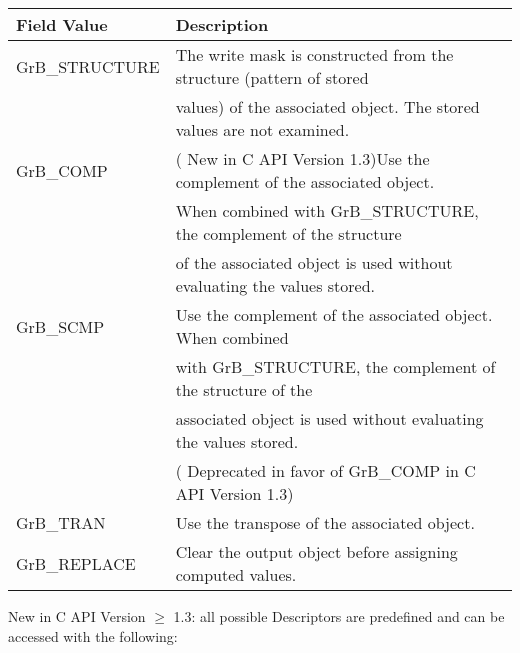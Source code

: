\documentclass[11pt]{article}
\begin{document}
\begin{tabular}{l|l} \hline
Field Value          & Description \\ \hline
{\sf GrB\_STRUCTURE} &  The write mask is constructed from the structure (pattern of stored \\
                     &  values) of the associated object. The stored values are not examined.\\
{\sf GrB\_COMP}      &  ({\color{red} New in C API Version 1.3})Use the complement of the associated object. \\ 
                     & When combined with {\sf GrB\_STRUCTURE}, the complement of the structure \\
                     &  of the associated object is used without evaluating the values stored.\\
{\sf GrB\_SCMP}      &  Use the complement of the associated object. When combined \\ 
                     &  with {\sf GrB\_STRUCTURE}, the complement of the structure of the \\
             &  associated object is used without evaluating the values stored. \\
             &  ({\color{red} Deprecated in favor of {\sf GrB\_COMP} in C API Version 1.3}) \\
{\sf GrB\_TRAN}      &  Use the transpose of the associated object.\\
{\sf GrB\_REPLACE}   &  Clear the output object before assigning computed values.\\ \hline
\end{tabular}

{\color{red} New in C API Version $\geq$ 1.3}: all possible Descriptors are predefined and can be accessed with the following:

\newcommand{\grboutp}{{\sf GrB\_OUTP}}
\newcommand{\grbmask}{{\sf GrB\_MASK}}
\newcommand{\grbinp}[1]{{\sf GrB\_INP#1}}
\newcommand{\grbrepl}{{\sf GrB\_REPLACE}}
\newcommand{\grbstrc}{{\sf GrB\_STRUCTURE}}
\newcommand{\grbcomp}{{\sf GrB\_COMP}}
\newcommand{\grbtran}{{\sf GrB\_TRAN}}
\end{document}
